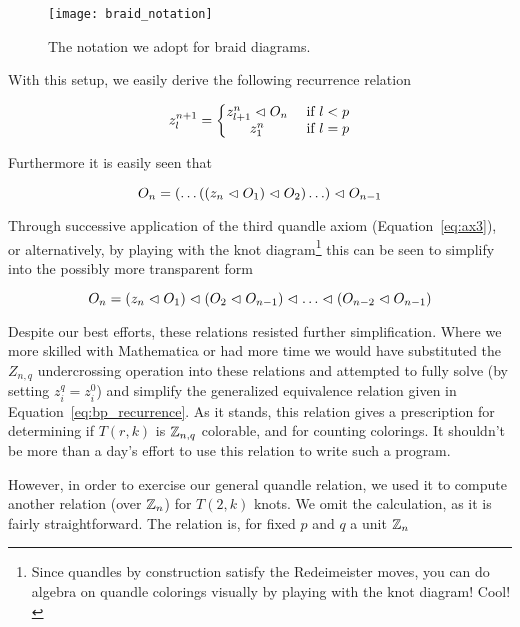 \documentclass[paper.tex]{subfiles}
\begin{document}
\begin{figure}[h]
   \centering
   \texttt{[image: braid\_notation]}
   \caption{The notation we adopt for braid diagrams.}\label{fig:braid_notation}
\end{figure}

With this setup, we easily derive the following recurrence relation

\begin{equation}
   \label{eq:pq_recurrence}
   z^{n+1}_l = \left\{
   \begin{matrix}
        z^n_{l+1} \vartriangleleft O_n &\text{ if } l < p \\
        z^n_1 &\text{ if } l = p
   \end{matrix}
   \right.
\end{equation}

Furthermore it is easily seen that

\begin{equation}
   O_n = (\ldots((z_n \vartriangleleft O_1) \vartriangleleft O_2) \ldots ) \vartriangleleft O_{n-1}
\end{equation}

Through successive application of the third quandle axiom (Equation~\ref{eq:ax3}), or alternatively, by playing with the knot diagram\footnote{Since quandles by construction satisfy the Redeimeister moves, you can do algebra
        on quandle colorings visually by playing with the knot diagram! Cool!} this can be seen to simplify into the possibly more transparent form

\begin{equation}
   O_n = (z_n \vartriangleleft O_1) \vartriangleleft (O_2 \vartriangleleft O_{n -1}) \vartriangleleft \ldots \vartriangleleft (O_{n - 2} \vartriangleleft O_{n - 1})
\end{equation}

Despite our best efforts, these relations resisted further simplification. Where we more skilled with Mathematica or had more time we would have substituted the $Z_{n,q}$ undercrossing operation into these relations
     and attempted to fully solve (by setting $z^q_{i} = z^0_{i}$) and simplify the generalized equivalence relation given in Equation~\ref{eq:bp_recurrence}. As it stands, this relation gives a prescription for
     determining if $T(r,k)$ is $\mathbb{Z}_{n,q}$ colorable, and for counting colorings. It shouldn't be more than a day's effort to use this relation to write such a program.

However, in order to exercise our general quandle relation, we used it to compute another relation (over $\mathbb{Z}_n$) for $T(2, k)$ knots. We omit the calculation, as it is fairly straightforward. The relation is, for fixed $p$
      and $q$ a unit $\mathbb{Z}_n$
\end{document}
